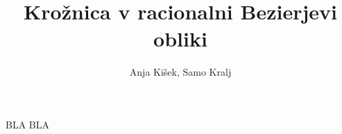 \documentclass[t]{beamer}
\title{Krožnica v racionalni Bezierjevi obliki}
\author{Anja Kišek, Samo Kralj}
\begin{document}
\begin{frame}
	\titlepage
\end{frame}
\begin{frame}
	BLA BLA
\end{frame}
\end{document}
